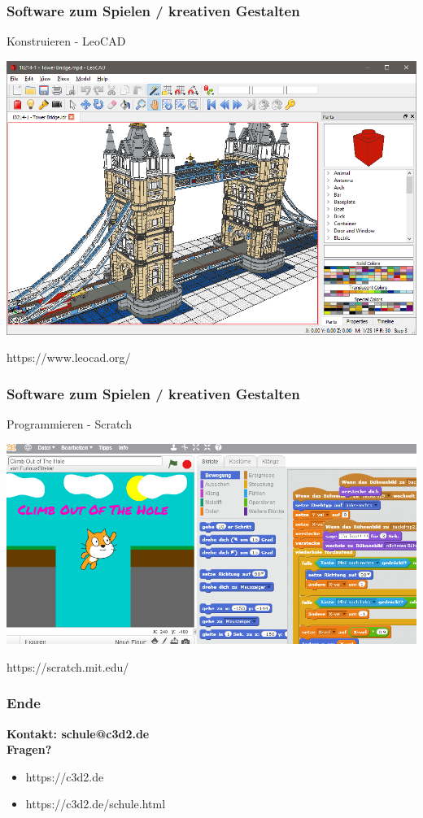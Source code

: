 \documentclass[12pt]{beamer}
\begin{document}
\begin{frame}
	\frametitle{Software zum Spielen / kreativen Gestalten}
	Konstruieren - LeoCAD 
	\begin{center}
		\includegraphics[height=0.6\textheight]{img/towerbridge.png}
	\end{center}
	https://www.leocad.org/
\end{frame}

\begin{frame}
	\frametitle{Software zum Spielen / kreativen Gestalten}
	Programmieren - Scratch
	\begin{center}
		\includegraphics[height=0.6\textheight]{img/scratch.png}
	\end{center}
	https://scratch.mit.edu/
\end{frame}


\begin{frame}
	\frametitle{Ende}
	\begin{center}
		\textbf{Kontakt: schule@c3d2.de} \\
		\textbf{Fragen?} 
	\end{center}
	\begin{itemize}
		\item https://c3d2.de
		\item https://c3d2.de/schule.html
	\end{itemize}
\end{frame}
\end{document}
